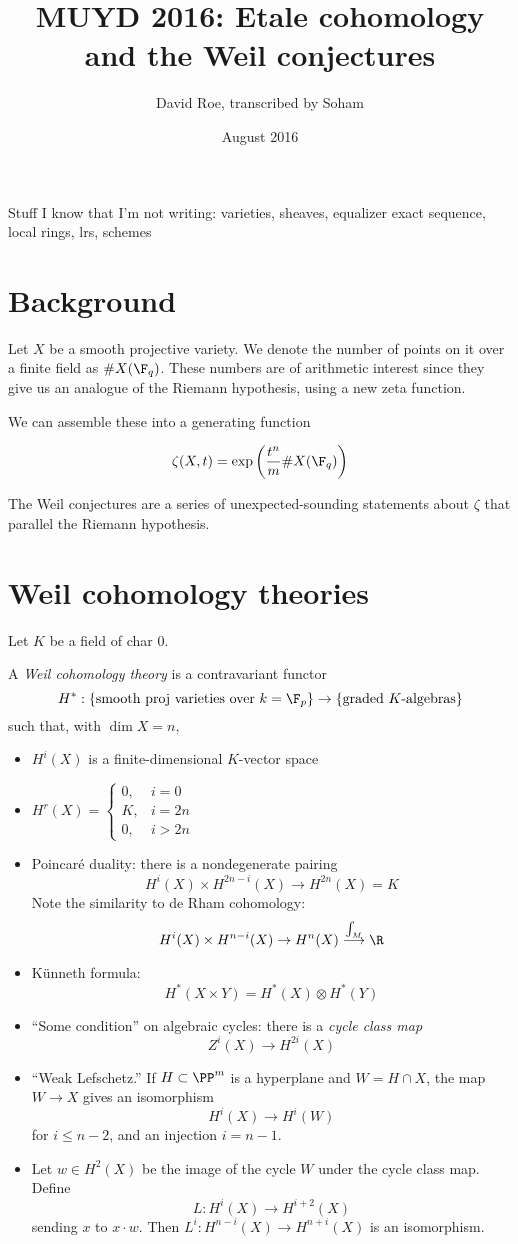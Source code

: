 \documentclass{scrreprt}
\title{MUYD 2016: Etale cohomology and the Weil conjectures}
\author{David Roe, transcribed by Soham}
\date{August 2016}
\begin{document}
\maketitle

Stuff I know that I'm not writing: varieties, sheaves, equalizer exact sequence,  local rings, lrs, schemes

\section{Background}
Let $X$ be a smooth projective variety. We denote the number of points on it
over a finite field as $\#X(\F_q)$. These numbers are of arithmetic interest
since they give us an analogue of the Riemann hypothesis, using a new zeta
function.

We can assemble these into a generating
function

$$\zeta(X,t)=\exp\left( \frac{t^n}m \#X(\F_q) \right) $$

The Weil conjectures are a series of unexpected-sounding statements about
$\zeta$ that parallel the Riemann hypothesis.

\section{Weil cohomology theories}
Let $K$ be a field of char $0$.
\begin{defn}
  A \textit{Weil cohomology theory} is a contravariant functor
  $$H^\ast: \{\text{smooth proj varieties over } k=\F_p\}\to\{\text{graded }K\text{-algebras}\}$$
  such that, with $\dim X=n$,
  \begin{itemize}
  \item $H^i(X)$ is a finite-dimensional $K$-vector space
  \item $H^r(X) =
    \begin{cases}
      0, &i=0\\
      K, &i = 2n\\
      0, &i>2n
    \end{cases}
    $
  \item Poincaré duality: there is a nondegenerate pairing
    $$H^i(X)\times H^{2n-i}(X)\to H^{2n}(X) = K$$
    Note the similarity to de Rham cohomology:
    $$H^i(X) \times H^{n-i}(X) \to H^{n}(X) \overset{\int_M}\longrightarrow \R$$
  \item Künneth formula:
    $$H^\ast(X\times Y) = H^\ast(X)\otimes H^\ast(Y)$$
  \item ``Some condition'' on algebraic cycles: there is a \textit{cycle class map}
    $$Z^i(X)\to H^{2i}(X)$$
  \item ``Weak Lefschetz.'' If $H\subset \PP^m$ is a hyperplane and $W=H\cap X$,
    the map $W\to X$ gives an isomorphism
    $$H^i(X)\to H^i(W)$$
    for $i\leq n-2$, and an injection $i=n-1$.
  \item Let $w\in H^2(X)$ be the image of the cycle $W$ under the cycle class
    map. Define
    $$L:H^i(X)\to H^{i+2}(X)$$
    sending $x$ to $x\cdot w$. Then $L^i:H^{n-i}(X)\to H^{n+i}(X)$ is an isomorphism.
  \end{itemize}
\end{defn}
\end{document}
